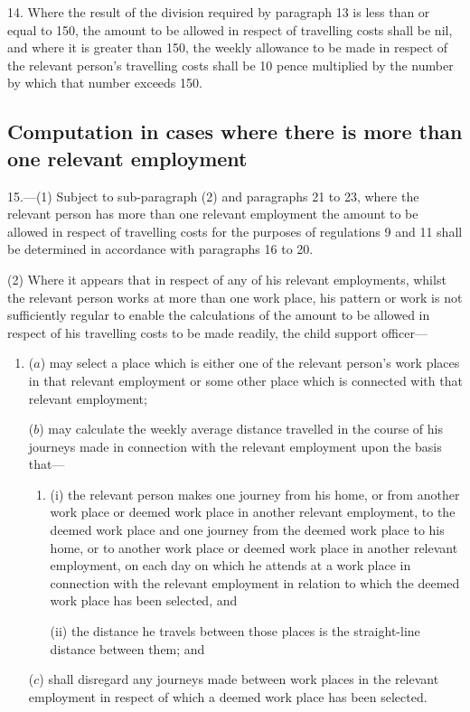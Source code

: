 \documentclass[12pt,a4paper]{article}
\begin{document}
\medskip

14.  Where the result of the division required by paragraph 13 is less than or equal to 150, the amount to be allowed in respect of travelling costs shall be nil, and where it is greater than 150, the weekly allowance to be made in respect of the relevant person’s travelling costs shall be 10 pence multiplied by the number by which that number exceeds 150.

\subsection*{Computation in cases where there is more than one relevant employment}

15.—(1) Subject to sub-paragraph (2) and paragraphs 21 to 23, where the relevant person has more than one relevant employment the amount to be allowed in respect of travelling costs for the purposes of regulations 9 and 11 shall be determined in accordance with paragraphs 16 to 20.

(2) Where it appears that in respect of any of his relevant employments, whilst the relevant person works at more than one work place, his pattern or work is not sufficiently regular to enable the calculations of the amount to be allowed in respect of his travelling costs to be made readily, the child support officer—
\begin{enumerate}\item[]
($a$) may select a place which is either one of the relevant person’s work places in that relevant employment or some other place which is connected with that relevant employment;

($b$) may calculate the weekly average distance travelled in the course of his journeys made in connection with the relevant employment upon the basis that—
\begin{enumerate}\item[]
(i) the relevant person makes one journey from his home, or from another work place or deemed work place in another relevant employment, to the deemed work place and one journey from the deemed work place to his home, or to another work place or deemed work place in another relevant employment, on each day on which he attends at a work place in connection with the relevant employment in relation to which the deemed work place has been selected, and

(ii) the distance he travels between those places is the straight-line distance between them; and
\end{enumerate}

($c$) shall disregard any journeys made between work places in the relevant employment in respect of which a deemed work place has been selected.
\end{enumerate}
\end{document}
